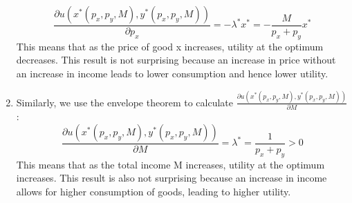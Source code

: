 \documentclass[UTF8,titlepage]{article}
\numberwithin{figure}{section}
\begin{document}
\begin{enumerate}
    \[\frac{\partial u(x^*(p_x, p_y, M), y^*(p_x, p_y, M))}{\partial p_x} = -\lambda^* x^* = -\frac{M}{p_x + p_y}x^*\]
    This means that as the price of good x increases, utility at the optimum decreases. This result is not surprising because an increase in price without an increase in income leads to lower consumption and hence lower utility.
    \item Similarly, we use the envelope theorem to calculate $\frac{\partial u(x^*(p_x, p_y, M), y^*(p_x, p_y, M))}{\partial M}$:
    \[\frac{\partial u(x^*(p_x, p_y, M), y^*(p_x, p_y, M))}{\partial M} = \lambda^* = \frac{1}{p_x + p_y} > 0\]
    This means that as the total income M increases, utility at the optimum increases. This result is also not surprising because an increase in income allows for higher consumption of goods, leading to higher utility.
\end{enumerate}
\end{document}
